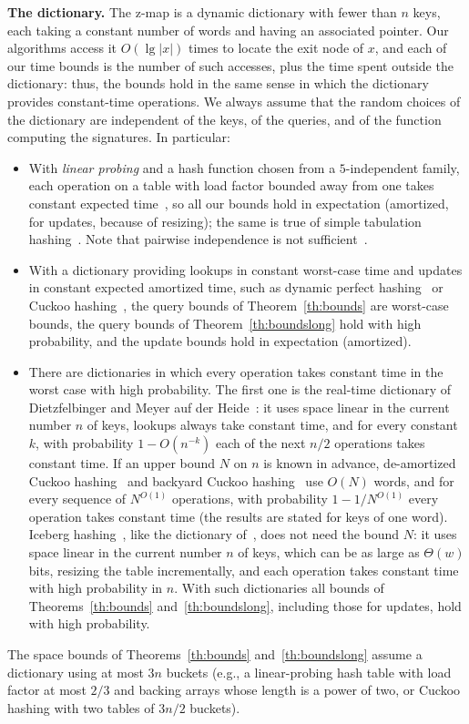 \documentclass[a4paper]{article}
\newcommand{\?}{\mskip1.5mu}
\begin{document}
\smallskip\noindent\textbf{The dictionary.} The z-map is a dynamic dictionary with fewer than $n$ keys, each taking a constant number
of words and having an associated pointer. Our algorithms access it $O(\lg|x|)$ times to locate the exit node of $x$, and each of our time bounds
is the number of such accesses, plus the time spent outside the dictionary: thus, the bounds hold in the same sense in which the dictionary provides
constant-time operations. We always assume that the random choices of the dictionary are independent of the keys, of the queries, and
of the function computing the signatures. In particular:
\begin{itemize}
  \item With \emph{linear probing} and a hash function chosen from a $5$-independent family, each operation on a table with load factor
  bounded away from one takes constant expected time~\cite{Pagh2009Linear}, so all our bounds hold in expectation (amortized,
  for updates, because of resizing); the same is true of simple tabulation hashing~\cite{Patrascu2012Power}. Note that pairwise
  independence is not sufficient~\cite{Pagh2009Linear}.
  \item With a dictionary providing lookups in constant worst-case time and updates in constant expected amortized time, such as
  dynamic perfect hashing~\cite{DKMDPHULB} or Cuckoo hashing~\cite{PaRCH}, the query bounds of Theorem~\ref{th:bounds} are worst-case bounds,
  the query bounds of Theorem~\ref{th:boundslong} hold with high probability, and the update bounds hold in expectation (amortized).
  \item There are dictionaries in which every operation takes constant time in the worst case with high probability.
  The first one is the real-time dictionary of Dietzfelbinger and Meyer auf der Heide~\cite{Dietzfelbinger1990New}: 
  it uses space linear in the current number $n$ of keys, lookups always take constant time, and for every constant $k$, 
  with probability $1-O(n^{-k})$ each of the next $n/2$ operations takes constant time.
  If an upper bound $N$ on $n$ is known in advance, de-amortized Cuckoo hashing~\cite{Arbitman2009Deamortized} and
  backyard Cuckoo hashing~\cite{Arbitman2010Backyard} use $O(N)$ words, and for every
  sequence of $N^{O(1)}$ operations, with probability $1-1/N^{O(1)}$ every operation takes constant time
  (the results are stated for keys of one word). Iceberg hashing~\cite{Bender2023Iceberg}, like the dictionary of~\cite{Dietzfelbinger1990New}, does not need the bound $N$: it 
  uses space linear in the current number $n$ of keys, which can be as large as $\Theta(w)$ bits, resizing the table incrementally, 
  and each operation takes constant time with high probability in $n$. With such dictionaries all bounds of 
  Theorems~\ref{th:bounds} and~\ref{th:boundslong}, including those for updates, hold with high probability.
\end{itemize}
The space bounds of Theorems~\ref{th:bounds} and~\ref{th:boundslong} assume a dictionary using at most $3n$ buckets
(e.g., a linear-probing hash table with load factor at most $2/3$ and
backing arrays whose length is a power of two, or Cuckoo hashing with two tables of $3n/2$ buckets).
\end{document}
